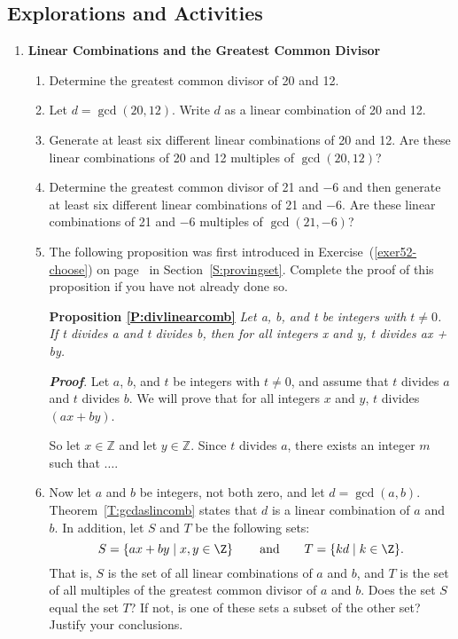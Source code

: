 \subsection*{Explorations and Activities}
\setcounter{oldenumi}{\theenumi}
\begin{enumerate} \setcounter{enumi}{\theoldenumi}
\item  \textbf{Linear Combinations and the Greatest Common Divisor} \label{exer81:lincomb} 
\begin{enumerate}
\item Determine the greatest common divisor of 20 and 12.

\item Let  $d = \gcd( {20, 12} )$.  Write  $d$  as a linear combination of  20  and  12.

\item Generate at least six different linear combinations of  20  and  12.  Are these linear combinations of 20 and 12 multiples of $\gcd( {20, 12} )$?  

\item Determine the greatest common divisor of 21 and $-6$ and then generate at least six different linear combinations of  21  and  $-6$.  Are these linear combinations of 21 and $-6$ multiples of 
$\gcd( {21, -6} )$?

\item The following proposition was first introduced in Exercise~(\ref{exer52-choose}) on page~\pageref{exer52-choose} in Section~\ref{S:provingset}.  Complete the proof of this proposition if you have not already done so.

\noindent
\textbf{Proposition \ref{P:divlinearcomb}}  \emph{Let a, b, and  t  be integers with $t \ne 0$.  If  t  divides  a  and  t  divides  b, then for all integers  x  and  y,  t  divides  
\text{(}ax + by\text{)}.}

\noindent
\textbf{\textit{Proof}}. Let $a$, $b$, and  $t$  be integers with $t \ne 0$, and assume that $t$  divides  $a$  and  $t$  divides  $b$.  We will prove that for all integers  $x$  and  $y$,  $t$  divides  $(ax + by)$.

So let  $x \in \mathbb{Z}$ and let  $y \in \mathbb{Z}$.  Since  $t$  divides  $a$, there exists an integer  $m$  such that $ \ldots .$

\item Now let $a$ and $b$ be integers, not both zero, and let $d = \gcd(a, b )$.  Theorem~\ref{T:gcdaslincomb} states that $d$ is a linear combination of $a$ and $b$.  In addition, let $S$ and $T$ be the following sets:
\[
S = \left\{ ax + by \mid x, y \in \Z \right\} \qquad \text{and} \qquad 
T = \left\{ kd \mid k \in \Z \right\}\!.
\]
That is, $S$ is the set of all linear combinations of $a$ and $b$, and $T$ is the set of all multiples of the greatest common divisor of $a$ and $b$.  Does the set $S$ equal the set $T$?  If not, is one of these sets a subset of the other set?  Justify your conclusions.


\end{enumerate}
\end{enumerate}
